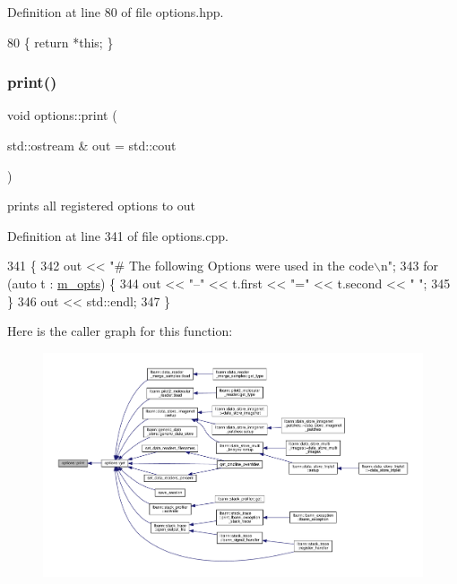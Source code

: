 Definition at line 80 of file options.\+hpp.


\begin{DoxyCode}
80 \{ \textcolor{keywordflow}{return} *\textcolor{keyword}{this}; \}
\end{DoxyCode}
\mbox{\label{classoptions_a6fd8a97883eaecb722e5c6b120d8f9be}} 
\subsubsection{\texorpdfstring{print()}{print()}}
{\footnotesize\ttfamily void options\+::print (\begin{DoxyParamCaption}\item[{std\+::ostream \&}]{out = {\ttfamily std\+:\+:cout} }\end{DoxyParamCaption})}



prints all registered options to \textquotesingle{}out\textquotesingle{} 



Definition at line 341 of file options.\+cpp.


\begin{DoxyCode}
341                                    \{
342   out << \textcolor{stringliteral}{"# The following Options were used in the code\(\backslash\)n"};
343   \textcolor{keywordflow}{for} (\textcolor{keyword}{auto} t : \hyperlink{classoptions_ac73507ca925d98ee5ff6f04937dff5c3}{m\_opts}) \{
344     out << \textcolor{stringliteral}{"--"} << t.first << \textcolor{stringliteral}{"="} << t.second << \textcolor{stringliteral}{" "};
345   \}
346   out << std::endl;
347 \}
\end{DoxyCode}
Here is the caller graph for this function\+:\nopagebreak
\begin{figure}[H]
\begin{center}
\leavevmode
\includegraphics[width=350pt]{classoptions_a6fd8a97883eaecb722e5c6b120d8f9be_icgraph}
\end{center}
\end{figure}
\mbox{\label{classoptions_a3c23831e4218f9a88cddc81337518046}} 
